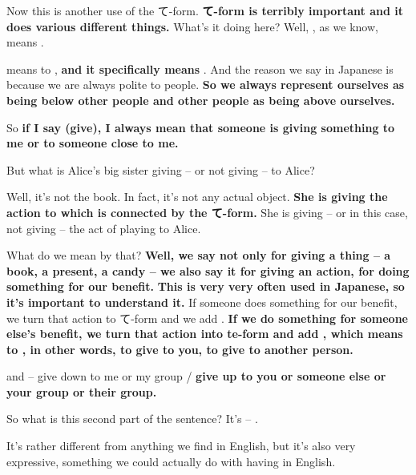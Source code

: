 
Now this is another use of the て-form. {\bf て-form is terribly important and it does various different things.} What's it doing here? Well, , as we know, means .

 means to , {\bf and it specifically means }. And the reason we say  in Japanese is because we are always polite to people. {\bf So we always represent ourselves as being below other people and other people as being above ourselves.}

{}

So {\bf if I say  (give), I always mean that someone is giving something to me or to someone close to me.}

But what is Alice's big sister giving -- or not giving -- to Alice?

{}

Well, it's not the book. In fact, it's not any actual object. {\bf She is giving the action to which  is connected by the て-form.} She is giving -- or in this case, not giving -- the act of playing to Alice.

What do we mean by that? {\bf Well, we say  not only for giving a thing -- a book, a present, a candy -- we also say it for giving an action, for doing something for our benefit.} {\bf This is very very often used in Japanese, so it's important to understand it.} If someone does something for our benefit, we turn that action to て-form and we add . {\bf If we do something for someone else's benefit, we turn that action into te-form and add , which means to , in other words, to give to you, to give to another person.}

 and  -- give down to me or my group /  {\bf give up to you or someone else or your group or their group.}

So what is this second part of the sentence? It's  -- .

{}

It's rather different from anything we find in English, but it's also very expressive, something we could actually do with having in English.

